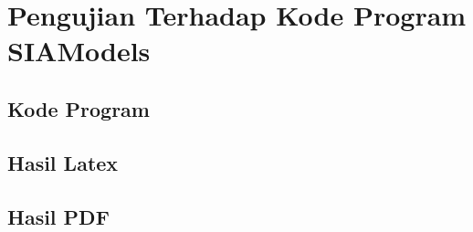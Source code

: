 \chapter{Pengujian Terhadap Kode Program SIAModels}
\label{lamp:C}

\section{Kode Program}
\label{kodeProgram:C}


\section{Hasil Latex}
\label{hasilLatex:C}


\section{Hasil PDF}
\label{hasilPDF:C}

